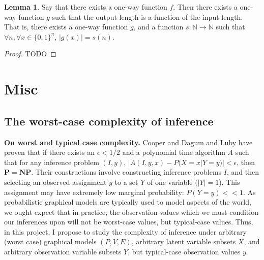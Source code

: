 \documentclass{article}
\renewcommand{\P}{\mathbf{P}}
\newcommand{\NP}{\mathbf{NP}}
\def \N {{\mathbb N}}
\theoremstyle{definition}
\newtheorem{lem}[thm]{Lemma}
\theoremstyle{remark}
\begin{document}
\begin{lem} \label{lem:constant_output_length}
Say that there exists a one-way function $f$.
Then there exists a one-way function $g$ such that the output length is a function of the input length.
That is, there exists a one-way function $g$, and a function $s : \N \to \N$ such that $\forall n, \forall x \in \{0, 1\}^n$, $|g(x)| = s(n)$.
\end{lem}
\begin{proof}
    TODO
\end{proof}

\newpage
\section{Misc}
\subsection{The worst-case complexity of inference}

\textbf{On worst and typical case complexity.} Cooper \cite{cooper1990} and Dagum and Luby \cite{dagum1993} have proven that if there exists an $\epsilon < 1/2$ and a polynomial time algorithm $A$ such that for any inference problem $(I, y)$, $|A(I, y, x) - P(X = x | Y = y)| < \epsilon$, then $\P = \NP$.
Their constructions involve constructing inference problems $I$, and then selecting an observed assignment $y$ to a set $Y$ of one variable ($|Y| = 1$).
This assignment may have extremely low marginal probability: $P(Y = y) << 1$.
As probabilistic graphical models are typically used to model aspects of the world, we ought expect that in practice, the observation values which we must condition our inferences upon will not be worst-case values, but typical-case values.
Thus, in this project, I propose to study the complexity of inference under arbitrary (worst case) graphical models $(P, V, E)$, arbitrary latent variable subsets $X$, and arbitrary observation variable subsets $Y$, but typical-case observation values $y$.
\end{document}
